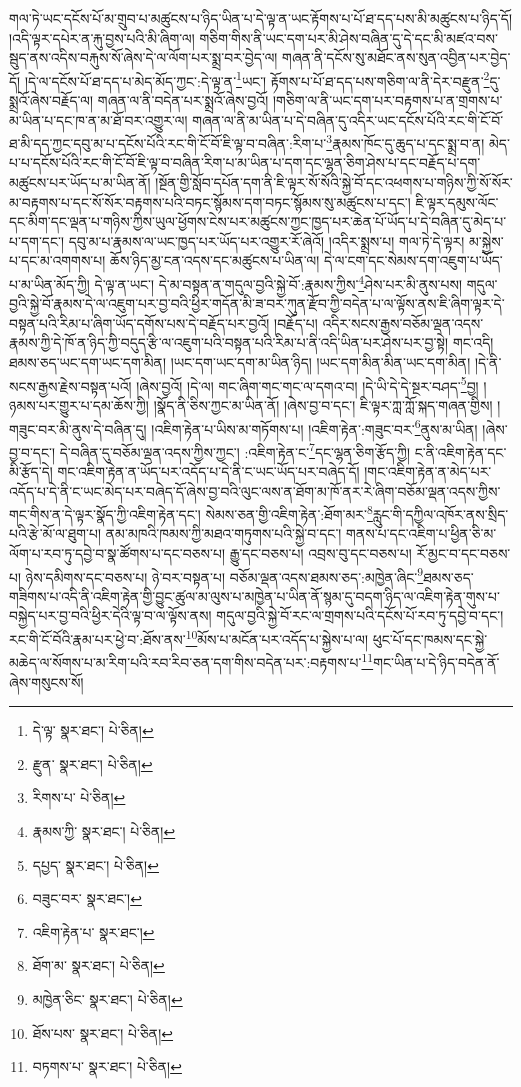 གལ་ཏེ་ཡང་དངོས་པོ་མ་གྲུབ་པ་མཚུངས་པ་ཉིད་ཡིན་པ་དེ་ལྟ་ན་ཡང་རྟོགས་པ་པོ་ཐ་དད་པས་མི་མཚུངས་པ་ཉིད་དོ། །འདི་ལྟར་དཔེར་ན་རྐུ་བྱས་པའི་མི་ཞིག་ལ། གཅིག་གིས་ནི་ཡང་དག་པར་མི་ཤེས་བཞིན་དུ་དེ་དང་མི་མཛའ་བས་སྦུད་ནས་འདིས་བརྐུས་སོ་ཞེས་དེ་ལ་ལོག་པར་སྨྲ་བར་བྱེད་ལ། གཞན་ནི་དངོས་སུ་མཐོང་ནས་སུན་འབྱིན་པར་བྱེད་དོ། །དེ་ལ་དངོས་པོ་ཐ་དད་པ་མེད་མོད་ཀྱང་:དེ་ལྟ་ན་\footnote{དེ་ལྟ་  སྣར་ཐང་།  པེ་ཅིན། }ཡང་། རྟོགས་པ་པོ་ཐ་དད་པས་གཅིག་ལ་ནི་དེར་བརྫུན་\footnote{རྫུན་  སྣར་ཐང་།  པེ་ཅིན། }དུ་སྨྲའོ་ཞེས་བརྗོད་ལ། གཞན་ལ་ནི་བདེན་པར་སྨྲའོ་ཞེས་བྱའོ། །གཅིག་ལ་ནི་ཡང་དག་པར་བརྟགས་པ་ན་གྲགས་པ་མ་ཡིན་པ་དང་ཁ་ན་མ་ཐོ་བར་འགྱུར་ལ། གཞན་ལ་ནི་མ་ཡིན་པ་དེ་བཞིན་དུ་འདིར་ཡང་དངོས་པོའི་རང་གི་ངོ་བོ་ཐ་མི་དད་ཀྱང་དབུ་མ་པ་དངོས་པོའི་རང་གི་ངོ་བོ་ཇི་ལྟ་བ་བཞིན་:རིག་པ་\footnote{རིགས་པ་  པེ་ཅིན། }རྣམས་ཁོང་དུ་ཆུད་པ་དང་སྨྲ་བ་ན། མེད་པ་པ་དངོས་པོའི་རང་གི་ངོ་བོ་ཇི་ལྟ་བ་བཞིན་རིག་པ་མ་ཡིན་པ་དག་དང་ལྷན་ཅིག་ཤེས་པ་དང་བརྗོད་པ་དག་མཚུངས་པར་ཡོད་པ་མ་ཡིན་ནོ། །སྔོན་གྱི་སློབ་དཔོན་དག་ནི་ཇི་ལྟར་སོ་སོའི་སྐྱེ་བོ་དང་འཕགས་པ་གཉིས་ཀྱི་སོ་སོར་མ་བརྟགས་པ་དང་སོ་སོར་བརྟགས་པའི་བཏང་སྙོམས་དག་བཏང་སྙོམས་སུ་མཚུངས་པ་དང་། ཇི་ལྟར་དམུས་ལོང་དང་མིག་དང་ལྡན་པ་གཉིས་ཀྱིས་ཡུལ་ཕྱོགས་ངེས་པར་མཚུངས་ཀྱང་ཁྱད་པར་ཆེན་པོ་ཡོད་པ་དེ་བཞིན་དུ་མེད་པ་པ་དག་དང་། དབུ་མ་པ་རྣམས་ལ་ཡང་ཁྱད་པར་ཡོད་པར་འགྱུར་རོ་ཞེའོ། །འདིར་སྨྲས་པ། གལ་ཏེ་དེ་ལྟར། མ་སྐྱེས་པ་དང་མ་འགགས་པ། ཆོས་ཉིད་མྱ་ངན་འདས་དང་མཚུངས་པ་ཡིན་ལ། དེ་ལ་ངག་དང་སེམས་དག་འཇུག་པ་ཡོད་པ་མ་ཡིན་མོད་ཀྱི། དེ་ལྟ་ན་ཡང་། དེ་མ་བསྟན་ན་གདུལ་བྱའི་སྐྱེ་བོ་:རྣམས་ཀྱིས་\footnote{རྣམས་ཀྱི་  སྣར་ཐང་།  པེ་ཅིན། }ཤེས་པར་མི་ནུས་པས། གདུལ་བྱའི་སྐྱེ་བོ་རྣམས་དེ་ལ་འཇུག་པར་བྱ་བའི་ཕྱིར་གདོན་མི་ཟ་བར་ཀུན་རྫོབ་ཀྱི་བདེན་པ་ལ་ལྟོས་ནས་ཇི་ཞིག་ལྟར་དེ་བསྟན་པའི་རིམ་པ་ཞིག་ཡོད་དགོས་པས་དེ་བརྗོད་པར་བྱའོ། །བརྗོད་པ། འདིར་སངས་རྒྱས་བཅོམ་ལྡན་འདས་རྣམས་ཀྱི་དེ་ཁོ་ན་ཉིད་ཀྱི་བདུད་རྩི་ལ་འཇུག་པའི་བསྟན་པའི་རིམ་པ་ནི་འདི་ཡིན་པར་ཤེས་པར་བྱ་སྟེ། གང་འདི། ཐམས་ཅད་ཡང་དག་ཡང་དག་མིན། །ཡང་དག་ཡང་དག་མ་ཡིན་ཉིད། །ཡང་དག་མིན་མིན་ཡང་དག་མིན། །དེ་ནི་སངས་རྒྱས་རྗེས་བསྟན་པའོ། །ཞེས་བྱའོ། །དེ་ལ། གང་ཞིག་གང་གང་ལ་དགའ་བ། །དེ་ཡི་དེ་དེ་སྔར་བཤད་\footnote{དཔྱད་  སྣར་ཐང་།  པེ་ཅིན། }བྱ། །ཉམས་པར་གྱུར་པ་དམ་ཆོས་ཀྱི། །སྣོད་ནི་ཅིས་ཀྱང་མ་ཡིན་ནོ། །ཞེས་བྱ་བ་དང་། ཇི་ལྟར་ཀླ་ཀློ་སྐད་གཞན་གྱིས། །གཟུང་བར་མི་ནུས་དེ་བཞིན་དུ། །འཇིག་རྟེན་པ་ཡིས་མ་གཏོགས་པ། །འཇིག་རྟེན་:གཟུང་བར་\footnote{བཟུང་བར་  སྣར་ཐང་། }ནུས་མ་ཡིན། །ཞེས་བྱ་བ་དང་། དེ་བཞིན་དུ་བཅོམ་ལྡན་འདས་ཀྱིས་ཀྱང་། :འཇིག་རྟེན་ང་\footnote{འཇིག་རྟེན་པ་  སྣར་ཐང་། }དང་ལྷན་ཅིག་རྩོད་ཀྱི། ང་ནི་འཇིག་རྟེན་དང་མི་རྩོད་དེ། གང་འཇིག་རྟེན་ན་ཡོད་པར་འདོད་པ་དེ་ནི་ང་ཡང་ཡོད་པར་བཞེད་དོ། །གང་འཇིག་རྟེན་ན་མེད་པར་འདོད་པ་དེ་ནི་ང་ཡང་མེད་པར་བཞེད་དོ་ཞེས་བྱ་བའི་ལུང་ལས་ན་ཐོག་མ་ཁོ་ནར་རེ་ཞིག་བཅོམ་ལྡན་འདས་ཀྱིས་གང་གིས་ན་དེ་ལྟར་སྣོད་ཀྱི་འཇིག་རྟེན་དང་། སེམས་ཅན་གྱི་འཇིག་རྟེན་:ཐོག་མར་\footnote{ཐོག་མ་  སྣར་ཐང་།  པེ་ཅིན། }རླུང་གི་དཀྱིལ་འཁོར་ནས་སྲིད་པའི་རྩེ་མོ་ལ་ཐུག་པ། ནམ་མཁའི་ཁམས་ཀྱི་མཐའ་གཏུགས་པའི་སྐྱེ་བ་དང་། གནས་པ་དང་འཇིག་པ་ཕྱིན་ཅི་མ་ལོག་པ་རབ་ཏུ་དབྱེ་བ་སྣ་ཚོགས་པ་དང་བཅས་པ། རྒྱུ་དང་བཅས་པ། འབྲས་བུ་དང་བཅས་པ། རོ་མྱང་བ་དང་བཅས་པ། ཉེས་དམིགས་དང་བཅས་པ། ཉེ་བར་བསྟན་པ། བཅོམ་ལྡན་འདས་ཐམས་ཅད་:མཁྱེན་ཞིང་\footnote{མཁྱེན་ཅིང་  སྣར་ཐང་།  པེ་ཅིན། }ཐམས་ཅད་གཟིགས་པ་འདི་ནི་འཇིག་རྟེན་གྱི་བྱུང་ཚུལ་མ་ལུས་པ་མཁྱེན་པ་ཡིན་ནོ་སྙམ་དུ་བདག་ཉིད་ལ་འཇིག་རྟེན་གུས་པ་བསྐྱེད་པར་བྱ་བའི་ཕྱིར་དེའི་ལྟ་བ་ལ་ལྟོས་ནས། གདུལ་བྱའི་སྐྱེ་བོ་རང་ལ་གྲགས་པའི་དངོས་པོ་རབ་ཏུ་དབྱེ་བ་དང་། རང་གི་ངོ་བོའི་རྣམ་པར་ཕྱེ་བ་:ཐོས་ནས་\footnote{ཐོས་པས་  སྣར་ཐང་།  པེ་ཅིན། }མོས་པ་མངོན་པར་འདོད་པ་སྐྱེས་པ་ལ། ཕུང་པོ་དང་ཁམས་དང་སྐྱེ་མཆེད་ལ་སོགས་པ་མ་རིག་པའི་རབ་རིབ་ཅན་དག་གིས་བདེན་པར་:བརྟགས་པ་\footnote{བཏགས་པ་  སྣར་ཐང་།  པེ་ཅིན། }གང་ཡིན་པ་དེ་ཉིད་བདེན་ནོ་ཞེས་གསུངས་སོ། 